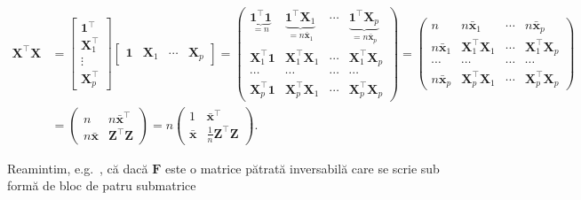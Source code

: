 \documentclass[]{article}
\begin{document}
\begin{align*}
  \boldsymbol X^\intercal \boldsymbol X &= \begin{bmatrix}\mathbf{1}^\intercal \\ \boldsymbol X_1^\intercal \\ \vdots \\ \boldsymbol X_p^\intercal\end{bmatrix}\begin{bmatrix}\mathbf{1} & \boldsymbol X_1 & \cdots &\boldsymbol X_p\end{bmatrix} = \begin{pmatrix}\underbrace{\mathbf{1}^\intercal\mathbf{1}}_{=n} & \underbrace{\mathbf{1}^\intercal\boldsymbol X_1}_{=n\bar{\boldsymbol x}_1} & \cdots & \underbrace{\mathbf{1}^\intercal\boldsymbol X_p}_{=n\bar{\boldsymbol x}_p}\\
  \boldsymbol X_1^\intercal\mathbf{1} & \boldsymbol X_1^\intercal\boldsymbol X_1 & \cdots & \boldsymbol X_1^\intercal \boldsymbol X_p\\
  \cdots & \cdots & \cdots & \cdots \\
  \boldsymbol X_p^\intercal\mathbf{1} & \boldsymbol X_p^\intercal\boldsymbol X_1 & \cdots & \boldsymbol X_p^\intercal \boldsymbol X_p\end{pmatrix} = \begin{pmatrix}n & n\bar{\boldsymbol x}_1 & \cdots & n\bar{\boldsymbol x}_p\\
  n\bar{\boldsymbol x}_1 & \boldsymbol X_1^\intercal\boldsymbol X_1 & \cdots & \boldsymbol X_1^\intercal \boldsymbol X_p\\ 
  \cdots & \cdots & \cdots & \cdots\\
  n\bar{\boldsymbol x}_p & \boldsymbol X_p^\intercal\boldsymbol X_1 & \cdots & \boldsymbol X_p^\intercal \boldsymbol X_p\end{pmatrix}\\
  &= \begin{pmatrix}n & n\bar{\boldsymbol x}^\intercal\\
  n\bar{\boldsymbol x} & \boldsymbol Z^\intercal \boldsymbol Z\end{pmatrix} = n\begin{pmatrix}1 & \bar{\boldsymbol x}^\intercal\\ \bar{\boldsymbol x} & \frac{1}{n}\boldsymbol Z^\intercal \boldsymbol Z\end{pmatrix}.
\end{align*}

Reamintim, e.g.~\citep{Searle1981}, că dacă \(\boldsymbol F\) este o
matrice pătrată inversabilă care se scrie sub formă de bloc de patru
submatrice
\end{document}
